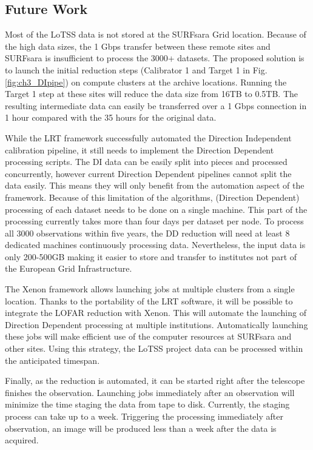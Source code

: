\subsection{Future Work}\label{sec:ch3_future}


Most of the LoTSS data is not stored at the SURFsara Grid location. Because of the high data sizes, the 1 Gbps transfer between these remote sites and SURFsara is insufficient to process the 3000+ datasets. The proposed solution is to launch the initial reduction steps (Calibrator 1 and Target 1 in Fig.\ref{fig:ch3_DIpipe}) on compute clusters at the archive locations. Running the Target 1 step at these sites will reduce the data size from 16TB to 0.5TB. The resulting intermediate data can easily be transferred over a 1 Gbps connection in 1 hour compared with the 35 hours for the original data. 

While the LRT framework successfully automated the Direction Independent calibration pipeline, it still needs to  implement the Direction Dependent processing scripts. The DI data can be easily split into pieces and processed concurrently, however current Direction Dependent pipelines cannot split the data easily. This means they will only benefit from the automation aspect of the framework. Because of this limitation of the algorithms, (Direction Dependent) processing of each dataset needs to be done on a single machine.  This part of the processing currently takes more than four days per dataset per node. To process all 3000 observations within five years, the DD reduction will need at least 8 dedicated machines continuously processing data. Nevertheless, the input data is only 200-500GB making it easier to store and transfer to institutes not part of the European Grid Infrastructure. 

The Xenon framework\cite{maasen_xenon} allows launching jobs at multiple clusters from a single location. Thanks to the portability of the LRT software, it will be possible to integrate the LOFAR reduction with Xenon. This will automate the launching of Direction Dependent processing at multiple institutions. Automatically launching these jobs will make efficient use of the computer resources at SURFsara and other sites. Using this strategy, the LoTSS project data can be processed within the anticipated timespan. 

Finally, as the reduction is automated, it can be started right after the telescope finishes the observation. Launching jobs immediately after  an observation will minimize the time staging the data from tape to disk. Currently, the staging process can take up to a week. Triggering the processing immediately after observation, an image will be produced less than a week after the data is acquired. 

